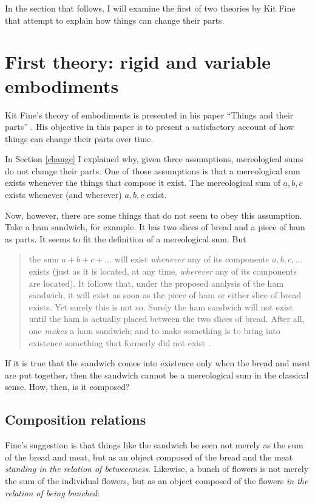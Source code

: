 \documentclass[12pt,twoside]{reedfancy}
\begin{document}
\begin{spacing}{1.25}
In the section that follows, I will examine the first of two theories
by Kit Fine that attempt to explain how things can change their parts.

\section{First theory: rigid and variable embodiments}
\label{fine-h}
Kit Fine's theory of embodiments is presented in his paper ``Things
and their parts'' \citeyearpar{fine1999}.  His objective in this paper
is to present a satisfactory account of how things can change their
parts over time.

In Section \ref{change} I explained why, given three assumptions,
mereological sums do not change their parts.  One of those assumptions
is that a mereological sum exists whenever the things that compose it
exist.  The mereological sum of $a, b, c$ exists whenever (and
wherever) $a, b, c$ exist.

Now, however, there are some things that do not seem to obey this
assumption.  Take a ham sandwich, for example.  It has two slices of
bread and a piece of ham as parts.  It seems to fit the definition of
a mereological sum.  But

\begin{quote}
the sum $a + b + c + ... $ will exist {\em whenever} any of
its components $a, b, c, ... $ exists (just as it is
located, at any time, {\em wherever} any of its components are
located).  It follows that, under the proposed analysis of the ham
sandwich, it will exist as soon as the piece of ham or either slice of
bread exists.  Yet surely this is not so.  Surely the ham sandwich
will not exist until the ham is actually placed between the two slices
of bread.  After all, one {\em makes} a ham sandwich; and to make
something is to bring into existence something that formerly did not
exist \citep[62]{fine1999}.
\end{quote}

If it is true that the sandwich comes into existence only when the
bread and meat are put together, then the sandwich cannot be a
mereological sum in the classical sense.  How, then, is it composed?

\subsection{Composition relations}
\label{rigid}
Fine's suggestion is that things like the sandwich be seen not merely
as the sum of the bread and meat, but as an object composed of the
bread and the meat {\em standing in the relation of betweenness}.
Likewise, a bunch of flowers is not merely the sum of the individual
flowers, but as an object composed of the flowers {\em in the relation
  of being bunched}:


\end{spacing}
\end{document}
